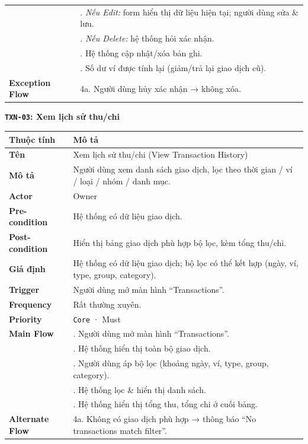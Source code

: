 \documentclass[11pt,a4paper]{article}
\newcounter{none}
\begin{document}
{\begin{longtable}[]{@{}
  >{\raggedright\arraybackslash}p{}
  >{\raggedright\arraybackslash}p{}@{}}
&3. \emph{Nếu Edit:} form hiển thị dữ liệu hiện tại; người dùng sửa \& lưu.\\
&4. \emph{Nếu Delete:} hệ thống hỏi xác nhận. \\
&5. Hệ thống cập nhật/xóa bản ghi. \\
&6. Số dư ví được tính lại (giảm/trả lại giao dịch cũ). \\ 
\textbf{Exception Flow} & 4a. Người dùng hủy xác nhận → không xóa. \\
\end{longtable}
}

\textbf{\texttt{TXN-03}: Xem lịch sử thu/chi}

{\def\LTcaptype{none}
\begin{longtable}[]{@{}
  >{\raggedright\arraybackslash}p{}
  >{\raggedright\arraybackslash}p{}@{}}
\toprule\noalign{}
\begin{minipage}[b]{\linewidth}\raggedright
Thuộc tính
\end{minipage} & \begin{minipage}[b]{\linewidth}\raggedright
Mô tả
\end{minipage} \\
\midrule\noalign{}
\endhead
\bottomrule\noalign{}
\endlastfoot
\textbf{Tên} & Xem lịch sử thu/chi (View Transaction History) \\ 
\textbf{Mô tả} & Người dùng xem danh sách giao dịch, lọc theo thời gian / ví / loại / nhóm / danh mục. \\ 
\textbf{Actor} & Owner \\ 
\textbf{Pre-condition} & Hệ thống có dữ liệu giao dịch. \\ 
\textbf{Post-condition} & Hiển thị bảng giao dịch phù hợp bộ lọc, kèm tổng thu/chi. \\ 
\textbf{Giả định} & Hệ thống có dữ liệu giao dịch; bộ lọc có thể kết hợp (ngày, ví, type, group, category). \\ 
\textbf{Trigger} & Người dùng mở màn hình ``Transactions''. \\ 
\textbf{Frequency} & Rất thường xuyên. \\ 
\textbf{Priority} & \texttt{Core} · Must \\ 
\textbf{Main Flow} & 1. Người dùng mở màn hình ``Transactions''.\\
&2. Hệ thống hiển thị toàn bộ giao dịch.\\
&3. Người dùng áp bộ lọc (khoảng ngày, ví, type, group, category).\\
&4. Hệ thống lọc \& hiển thị danh sách.\\
&5. Hệ thống hiển thị tổng thu, tổng chi ở cuối bảng. \\ 
\textbf{Alternate Flow} & 4a. Không có giao dịch phù hợp → thông báo ``No transactions match filter''. \\
\end{longtable}
}
\end{document}
